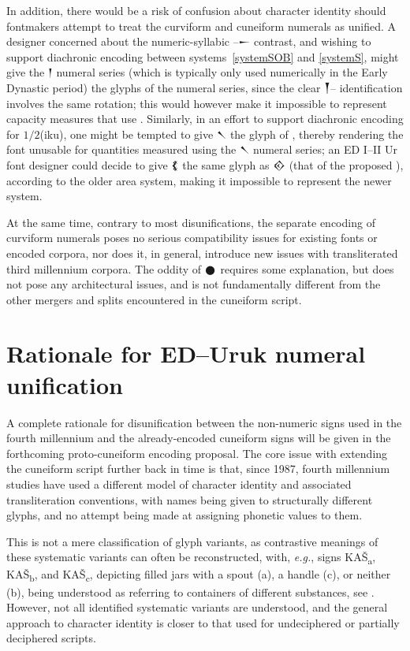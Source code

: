 \documentclass[10pt, a4paper, twoside]{article}
\newcommand\oneAšC{{\proposalfont\symbol{"12550}}} %
\newcommand\oneDišC{{\proposalfont\symbol{"12559}}}
\newcommand\oneŊešTwoC{{\proposalfont\symbol{"1256B}}}
\newcommand\oneŊešʾuC{{\proposalfont\symbol{"12574}}}
\newcommand\oneŠarTwoC{{\proposalfont\symbol{"12579}}}
\newcommand\oneŠarʾuC{{\proposalfont\symbol{"12582}}}
\newcommand{\exempligratia}{\emph{e.g.}}
\begin{document}
In addition, there would be a risk of confusion about character identity should
fontmakers attempt to treat the curviform and cuneiform numerals as unified.
A designer concerned about the numeric-syllabic \oneAšC--{\xsuxfont 𒀸} contrast,
and wishing to support diachronic encoding between systems~\ref{systemSOB} and \ref{systemS},
might give the {\xsuxfont 𒁹} numeral series (which is typically only used numerically
in the Early Dynastic period) the glyphs of the \oneAšC{} numeral series,
since the clear {\xsuxfont 𒐕}--\oneŊešTwoC{} identification involves the same rotation;
this would however make it impossible to represent capacity measures that use \oneDišC{}.
Similarly, in an effort to support diachronic encoding for $1/2$(iku),
one might be tempted to give {\xsuxfont 𒀹} the glyph
of \oneDišC{}, thereby rendering the font unusable for quantities measured using
the {\xsuxfont 𒀹} numeral series;
an ED I--II Ur font designer could decide to give {\xsuxfont 𒐴}
the same glyph as {\xsuxfont 𒐬} (that of the proposed \oneŠarʾuC), according to the older area system,
making it impossible to represent the newer system.

At the same time, contrary to most disunifications,
the separate encoding of curviform numerals poses no serious compatibility issues
for existing fonts or encoded corpora,
nor does it, in general,
introduce new issues with transliterated third millennium corpora.
The oddity of {\originalNoto 𒊹} requires some explanation,
but does not pose any architectural issues,
and is not fundamentally different from the other mergers and splits
encountered in the cuneiform script.

\section{Rationale for ED–Uruk numeral unification}
\label{unificationRationale}
A complete rationale for disunification between the non-numeric signs used
in the fourth millennium and the already-encoded cuneiform signs will
be given in the forthcoming proto-cuneiform encoding proposal.
The core issue with extending the cuneiform script further back in time
is that, since 1987, fourth millennium studies have used a different model
of character identity and associated transliteration conventions,
with names being given to structurally different glyphs, and no attempt being made
at assigning phonetic values to them.

This is not a mere classification of glyph variants, as contrastive meanings
of these systematic variants can often be reconstructed,
with, \exempligratia, signs KAŠ\textsubscript*{a}, KAŠ\textsubscript*{b}, and
KAŠ\textsubscript*{c}, depicting filled jars with a spout (a), a handle (c),
or neither (b), being understood as referring to containers of different substances,
see \cite[34\psq]{Englund2001}.
However, not all identified systematic variants are understood, and the general
approach to character identity is closer to that used for undeciphered or
partially deciphered scripts.
\end{document}
